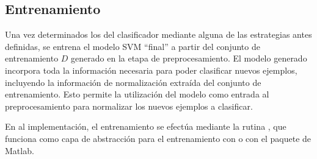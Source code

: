 %
%
\subsection{Entrenamiento}
%
Una vez determinados los  del clasificador mediante alguna
de las estrategias antes definidas, se entrena el modelo SVM ``final''
a partir del conjunto de entrenamiento $D$ generado en la etapa de
preprocesamiento.
El modelo generado incorpora toda la información necesaria para poder
clasificar nuevos ejemplos, incluyendo la información de normalización
extraída del conjunto de entrenamiento.
Esto permite la utilización del modelo como entrada al
preprocesamiento para normalizar los nuevos ejemplos a clasificar.

En al implementación, el entrenamiento se efectúa mediante la rutina
, que funciona como capa de abstracción para el
entrenamiento con  \cite{libsvm} o con el paquete
 de Matlab.
